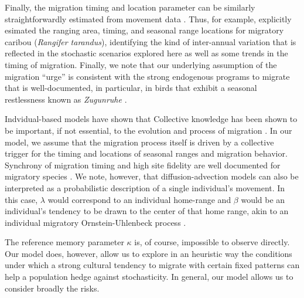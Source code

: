 \documentclass[12pt]{article}
\begin{document}
Finally, the migration timing and location parameter can be similarly straightforwardly estimated from movement data \citep{Cagnacci2015, Gurarie2019}. Thus, for example, \citet{Gurarie2019} explicitly esimated the ranging area, timing, and seasonal range locations for migratory caribou (\emph{Rangifer tarandus}), identifying the kind of inter-annual variation that is reflected in the stochastic scenarios explored here as well as some trends in the timing of migration. Finally, we note that our underlying assumption of the migration ``urge'' is consistent with the strong endogenous programs to migrate that is well-documented, in particular, in birds that exhibit a seasonal restlessness known as \emph{Zugunruhe} \citep{Berthold1999, Helm2006}.

Indvidual-based models have shown that Collective knowledge has been shown to be important, if not essential, to the evolution and process of migration \citep{Shaw2013, Guttal2010, Berdahl2018}. In our model, we assume that the migration process itself is driven by a collective trigger for the timing and locations of seasonal ranges and migration behavior. Synchrony of migration timing and high site fidelity are well documented for migratory species \citep{Gurarie2019, Joly2021}. We note, however, that diffusion-advection models can also be interpreted as a probabilistic description of a single individual's movement. In this case, $\lambda$ would correspond to an individual home-range and $\beta$ would be an individual's tendency to be drawn to the center of that home range, akin to an individual migratory Ornstein-Uhlenbeck process \citep{Gurarie2017}.

The reference memory parameter $\kappa$ is, of course, impossible to observe directly. Our model does, however, allow us to explore in an heuristic way the conditions under which a strong cultural tendency to migrate with certain fixed patterns can help a population hedge against stochasticity. In general, our model allows us to consider broadly the risks.
\end{document}
